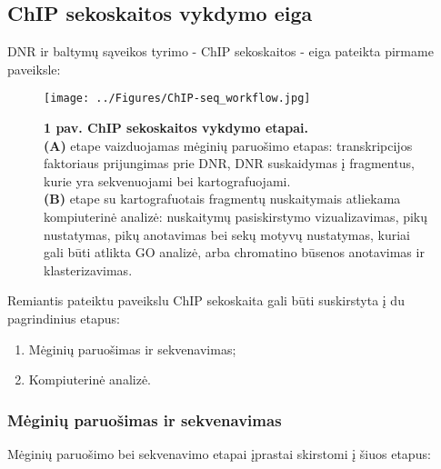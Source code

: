 \documentclass[12pt]{article}
\begin{document}

\subsection{ChIP sekoskaitos vykdymo eiga}
DNR ir baltymų sąveikos tyrimo - ChIP sekoskaitos - eiga pateikta pirmame
paveiksle:

\begin{figure}[ht]
    \begin{center}
        \captionsetup{justification=centering}
        \texttt{[image: ../Figures/ChIP-seq\_workflow.jpg]}
        \vspace{-1\baselineskip}
        \caption*{\small\textbf{1 pav. ChIP sekoskaitos vykdymo etapai.}\\
            \textbf{(A)} etape vaizduojamas mėginių paruošimo etapas:
            transkripcijos faktoriaus prijungimas prie DNR, DNR suskaidymas į
            fragmentus, kurie yra sekvenuojami bei kartografuojami.\\
            \textbf{(B)} etape su kartografuotais fragmentų nuskaitymais
            atliekama kompiuterinė analizė: nuskaitymų pasiskirstymo
            vizualizavimas, pikų nustatymas, pikų anotavimas bei sekų motyvų
            nustatymas, kuriai gali būti atlikta GO analizė, arba chromatino
            būsenos anotavimas ir klasterizavimas.}
    \end{center}
\end{figure}

Remiantis pateiktu paveikslu ChIP sekoskaita gali būti suskirstyta į du
pagrindinius etapus:

\begin{enumerate}
    \item Mėginių paruošimas ir sekvenavimas;
    \item Kompiuterinė analizė.
\end{enumerate}

\subsubsection{Mėginių paruošimas ir sekvenavimas}
Mėginių paruošimo bei sekvenavimo etapai įprastai skirstomi į šiuos etapus:
\end{document}
